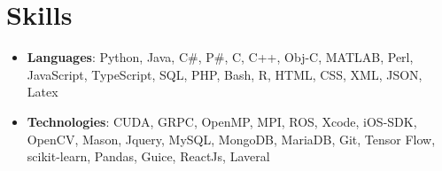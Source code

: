 \documentclass[a4paper,11pt]{article}
\newcommand{\projectItem}[2]{
	\item\small{
    \textbf{#1}{: #2 \vspace{-5pt}}
  }
}
\newcommand{\skillItem}[2]{
	\item\small{
    \textbf{#1}{: #2 \vspace{-5pt}}
  }
}
\newcommand{\sectionStart}{\begin{itemize}[leftmargin=*]}
\newcommand{\sectionEnd}{\end{itemize}}{\vspace{-100pt}}
\begin{document}

\section{Skills}
	\sectionStart
		\skillItem{Languages}
		{Python, Java, C\#, P\#, C, C++, Obj-C, MATLAB, Perl, JavaScript, TypeScript, SQL, PHP, Bash, R, HTML, CSS, XML, JSON, Latex}
		\skillItem{Technologies}
		{CUDA, GRPC, OpenMP, MPI, ROS, Xcode, iOS-SDK, OpenCV, Mason, Jquery, MySQL, MongoDB, MariaDB, Git, Tensor Flow, scikit-learn, Pandas, Guice, ReactJs, Laveral}
	\sectionEnd
\end{document}
